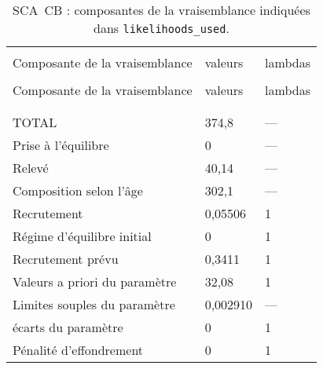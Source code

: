 \setlength{\tabcolsep}{0pt}
\begin{longtable}[c]{>{\raggedright\let\newline\\\arraybackslash\hspace{0pt}}p{2.31in}>{\raggedleft\let\newline\\\arraybackslash\hspace{0pt}}p{1.35in}>{\raggedleft\let\newline\\\arraybackslash\hspace{0pt}}p{1.35in}}
  \caption{SCA~CB : composantes de la vraisemblance indiqu\'{e}es dans \texttt{likelihoods\_used}.} \label{tab:car.like1}\\  \hline\\[-2.2ex]  Composante de la vraisemblance  & valeurs & lambdas \\[0.2ex]\hline\\[-1.5ex]  \endfirsthead   \hline  Composante de la vraisemblance  & valeurs & lambdas \\[0.2ex]\hline\\[-1.5ex]  \endhead  \hline\\[-2.2ex]   \endfoot  \hline \endlastfoot
  TOTAL & 374,8 & --- \\ 
  Prise \`{a} l'\'{e}quilibre & 0 & --- \\ 
  Relev\'{e} & 40,14 & --- \\ 
  Composition selon l'\^{a}ge & 302,1 & --- \\ 
  Recrutement & 0,05506 & 1 \\ 
  R\'{e}gime d'\'{e}quilibre initial & 0 & 1 \\ 
  Recrutement pr\'{e}vu & 0,3411 & 1 \\ 
  Valeurs a priori du param\`{e}tre & 32,08 & 1 \\ 
  Limites souples du param\`{e}tre & 0,002910 & --- \\ 
  \'{e}carts du param\`{e}tre & 0 & 1 \\ 
  P\'{e}nalit\'{e} d'effondrement & 0 & 1 \\ 
\end{longtable}\setlength{\tabcolsep}{0pt}

\newpage
{}


